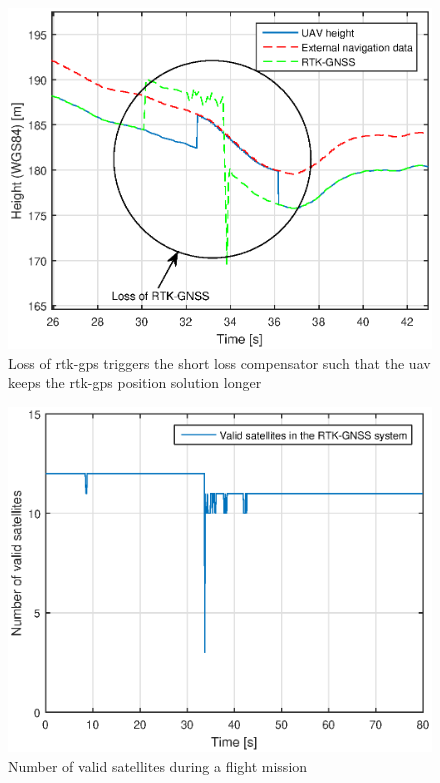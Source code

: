 \begin{figure}[H]
\centering
\includegraphics[scale=0.7]{figs/Experiment/shortrtkloss1juni114124.eps}
\caption{Loss of \gls{rtk-gps} triggers the short loss compensator such that the \gls{uav} keeps the \gls{rtk-gps} position solution longer}
\label{Fig:ShortLoss}
\end{figure}
\begin{figure}
\centering
\includegraphics[scale=0.7]{figs/Experiment/ShortrtklossSatellites1juni114124.eps}
\caption{Number of valid satellites during a flight mission}
\label{Fig:SatCount1juni114124}
\end{figure}
